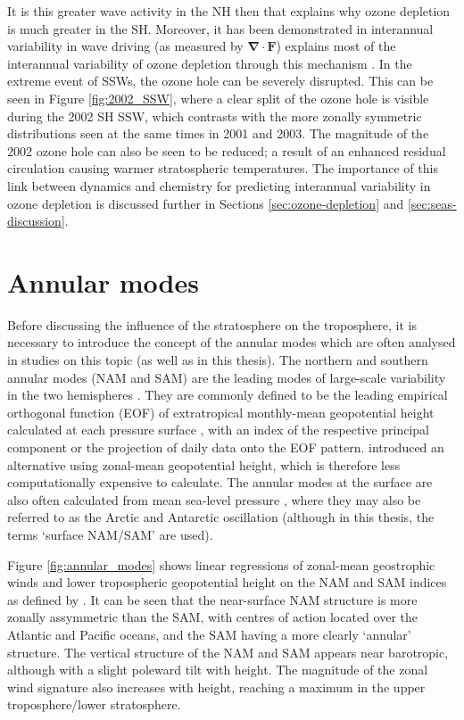 It is this greater wave activity in the NH then that explains why ozone
depletion is much greater in the SH. Moreover, it has been demonstrated in
interannual variability in wave driving (as measured by
$\mathbf{\nabla\cdot F}$) explains most of the interannual variability of ozone
depletion through this mechanism \citep{Salby2012}. In the extreme event of
SSWs, the ozone hole can be severely disrupted. This can be seen in Figure
\ref{fig:2002_SSW}, where a clear split of the ozone hole is visible during the
2002 SH SSW, which contrasts with the more zonally symmetric distributions seen
at the same times in 2001 and 2003. The magnitude of the 2002 ozone hole can
also be seen to be reduced; a result of an enhanced residual circulation causing
warmer stratospheric temperatures. The importance of this link between dynamics
and chemistry for predicting interannual variability in ozone depletion is
discussed further in Sections \ref{sec:ozone-depletion} and
\ref{sec:seas-discussion}.

\section{Annular modes}
\label{sec:annular-modes}
Before discussing the influence of the stratosphere on the troposphere, it is
necessary to introduce the concept of the annular modes which are often analysed
in studies on this topic (as well as in this thesis). The northern and southern
annular modes (NAM and SAM) are the leading modes of large-scale variability in
the two hemispheres
\citep{Baldwin1999,Thompson2000a,Thompson2000,Limpasuvan1999,Limpasuvan2000}. They
are commonly defined to be the leading empirical orthogonal function (EOF) of
extratropical monthly-mean geopotential height calculated at each pressure
surface \citep[e.g.,][]{Baldwin1999}, with an index of the respective principal
component or the projection of daily data onto the EOF
pattern. \citet{Baldwin2009} introduced an alternative using zonal-mean
geopotential height, which is therefore less computationally expensive to
calculate. The annular modes at the surface are also often calculated from mean
sea-level pressure \citep[e.g.,][]{Gong1999}, where they may also be referred to
as the Arctic and Antarctic oscillation (although in this thesis, the terms
`surface NAM/SAM' are used).

Figure \ref{fig:annular_modes} shows linear regressions of zonal-mean
geostrophic winds and lower tropospheric geopotential height on the NAM and SAM
indices as defined by \citet{Thompson2000a}. It can be seen that the
near-surface NAM structure is more zonally assymmetric than the SAM, with
centres of action located over the Atlantic and Pacific oceans, and the SAM
having a more clearly `annular' structure. The vertical structure of the NAM and
SAM appears near barotropic, although with a slight poleward tilt with
height. The magnitude of the zonal wind signature also increases with height,
reaching a maximum in the upper troposphere/lower stratosphere. 

